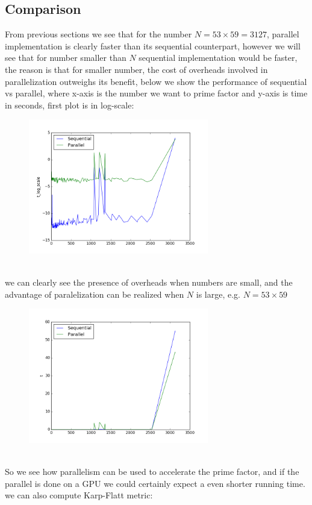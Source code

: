 \documentclass[10pt]{article}
\begin{document}
\subsection{Comparison}
From previous sections we see that for the number $N=53\times59=3127$, parallel implementation is clearly faster than its sequential counterpart, however we will see that for number smaller than $N$ sequential implementation would be faster, the reason is that for smaller number, the cost of overheads involved in parallelization outweighs its benefit, below we show the performance of sequential vs parallel, where x-axis is the number we want to prime factor and y-axis is time in seconds, first plot is in log-scale:
\begin{figure}[h!]
	\centering
	\includegraphics[width=0.7\textwidth]{figure_1.png}
\end{figure}\\
we can clearly see the presence of overheads when numbers are small, and the advantage of paralelization can be realized when $N$ is large, e.g. $N=53\times59$ \\
\begin{figure}[h!]
	\centering
	\includegraphics[width=0.7\textwidth]{figure_2.png}
\end{figure} \\
So we see how parallelism can be used to accelerate the prime factor, and if the parallel is done on a GPU we could certainly expect a even shorter running time. \\
we can also compute Karp-Flatt metric:
\end{document}
